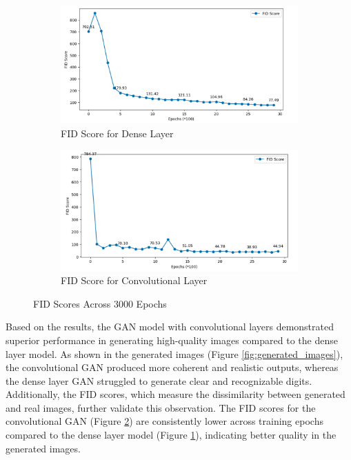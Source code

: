 \begin{figure}[H]
    \centering
    \begin{subfigure}[b]{\linewidth}
        \centering
        \includegraphics[width=0.7\linewidth]{./Images/fid_score_for_dense_layer.jpg}
        \caption{FID Score for Dense Layer}
        \label{fig:fid_dense}
    \end{subfigure}
    \vspace{0.05\linewidth} 
    \begin{subfigure}[b]{\linewidth}
        \centering
        \includegraphics[width=0.7\linewidth]{./Images/fid_score_for_convolution_layer.jpg}
        \caption{FID Score for Convolutional Layer}
        \label{fig:fid_conv}
    \end{subfigure}
    \caption{FID Scores Across 3000 Epochs}
    \label{fig:fid_scores}
\end{figure}

Based on the results, the GAN model with convolutional layers demonstrated superior performance in generating high-quality images compared to the dense layer model. As shown in the generated images (Figure \ref{fig:generated_images}), the convolutional GAN produced more coherent and realistic outputs, whereas the dense layer GAN struggled to generate clear and recognizable digits. Additionally, the FID scores, which measure the dissimilarity between generated and real images, further validate this observation. The FID scores for the convolutional GAN (Figure \ref{fig:fid_conv}) are consistently lower across training epochs compared to the dense layer model (Figure \ref{fig:fid_dense}), indicating better quality in the generated images.

